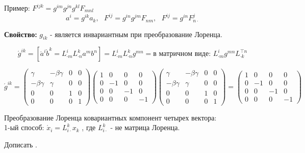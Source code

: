 \documentclass[12pt, a4paper]{report}
\begin{document}
Пример: \( F^{ij k }  = g^{im } g^{j n }  g^{kl }  F_{mn l}   \)
\[ a^i = g^{ik }  a_k , \text{ }  F^{ij }  = g^{in } g^{jm } F_{nm }  ,\text{ }  F^{i j }  = g^{ in } F_{n \cdot }  ^j     \]  

\textbf{Свойство:} \( g_{ik }  \)  - является инвариантным при преобразование Лоренца.

\[ \acute{g } ^{ik }  = [\acute{ a } ^i \acute{b } ^k = L^i _{\cdot m }  L^k _{\cdot n } a^m b^n ] = L^i _{\cdot m }  L^k _{\cdot n }  g^{mn }  = \text{в матричном виде: } L^{i }  _{\cdot m }  g^{mn }  L^{\top n }_{\cdot k}    \] 

\[ \acute{g } ^{ik }  = \begin{pmatrix}
\gamma   & - \beta \gamma & 0 & 0\\
-\beta \gamma& \gamma  & 0& 0\\
0 & 0 & 1 & 0\\
0 & 0 & 0 & 1
\end{pmatrix} \begin{pmatrix}
1 & 0 & 0 & 0\\
0 & -1 & 0 & 0\\
0 & 0 & -1 & 0\\
0 & 0 & 0 & -1
\end{pmatrix} \begin{pmatrix}
    \gamma   & - \beta \gamma & 0 & 0\\
    -\beta \gamma& \gamma  & 0& 0\\
    0 & 0 & 1 & 0\\
    0 & 0 & 0 & 1
    \end{pmatrix} = \begin{pmatrix}
        1 & 0 & 0 & 0\\
        0 & -1 & 0 & 0\\
        0 & 0 & -1 & 0\\
        0 & 0 & 0 & -1
        \end{pmatrix} \] 

Преобразование Лоренца ковариантных компонент четырех вектора: \\

1-ый способ: \( \acute{x } _i = L _{i \cdot }  ^k x_k \) 
, где \( L^k _{i \cdot}  \) - не матрица Лоренца.

Дописать .


\ifdefined\mainfile
\else
    
\end{document}
